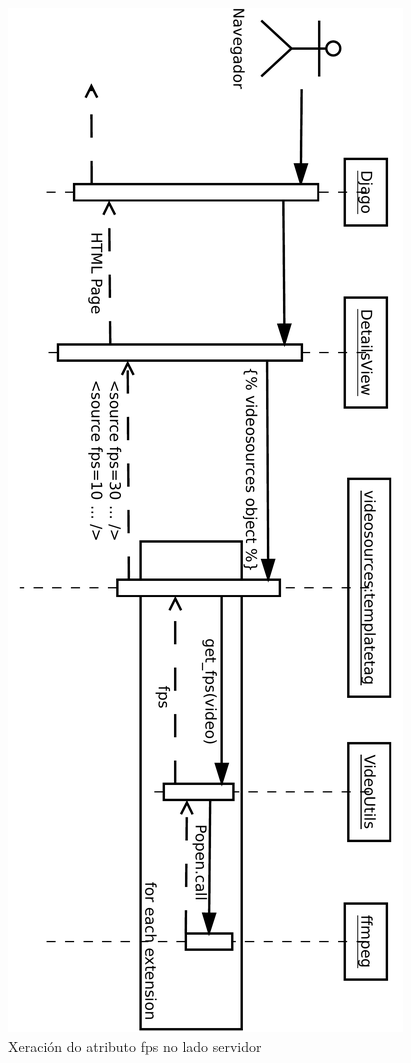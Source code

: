        \begin{figure}[htp]
        \begin{center}
            \includegraphics[scale=0.5]{figures/GenerateFpsDjango.pdf}
            \caption{Xeración do atributo fps no lado servidor}
        \label{fig:GenerateFpsDjango}
        \end{center}
        \end{figure}
                
